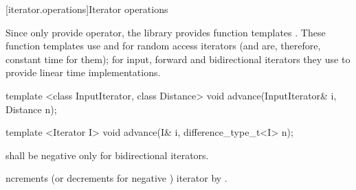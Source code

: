[iterator.operations]{Iterator operations}

\pnum
Since only  provide \tcode{+}  \tcode{-}
operator, the library provides  function templates
\added{,}
.
These
function templates
use
\tcode{+}
and
\tcode{-}
for random access iterators (and are, therefore, constant
time for them); for input, forward and bidirectional iterators they use
\tcode{++}
to provide linear time
implementations.

%
\begin{removedblock}
\begin{itemdecl}
template <class InputIterator, class Distance>
  void advance(InputIterator& i, Distance n);
\end{itemdecl}
\end{removedblock}
\begin{addedblock}
\begin{itemdecl}
template <Iterator I>
  void advance(I& i, difference_type_t<I> n);
\end{itemdecl}
\end{addedblock}

\begin{itemdescr}
\pnum
\requires
{}
shall be negative only for bidirectional iterators.

\pnum
\effects
{}ncrements (or decrements for negative
)
iterator
by
.
\end{itemdescr}

